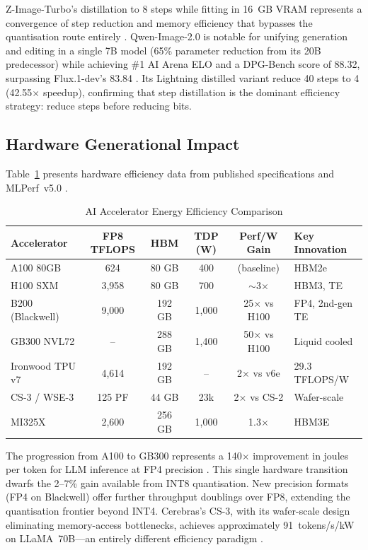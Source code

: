 \documentclass[AMS,STIX2COL]{WileyNJD-v2}
\begin{document}
Z-Image-Turbo's distillation to 8 steps while fitting in 16~GB VRAM represents a convergence of step reduction and memory efficiency that bypasses the quantisation route entirely \cite{tongyi2025zimage}. Qwen-Image-2.0 is notable for unifying generation and editing in a single 7B model (65\% parameter reduction from its 20B predecessor) while achieving \#1 AI Arena ELO and a DPG-Bench score of 88.32, surpassing Flux.1-dev's 83.84 \cite{wu2025qwenimage}. Its Lightning distilled variant reduce 40 steps to 4 (42.55$\times$ speedup), confirming that step distillation is the dominant efficiency strategy: reduce steps before reducing bits.

\subsection{Hardware Generational Impact}

Table~\ref{tab:hw_efficiency} presents hardware efficiency data from published specifications and MLPerf~v5.0 \cite{mlperf2025inference}.

\begin{table}[t]
\caption{AI Accelerator Energy Efficiency Comparison}\label{tab:hw_efficiency}
\centering
\begin{tabular}{lccccl}
\toprule
\textbf{Accelerator} & \textbf{FP8 TFLOPS} & \textbf{HBM} & \textbf{TDP (W)} & \textbf{Perf/W Gain} & \textbf{Key Innovation} \\
\midrule
A100 80GB             & 624    & 80 GB   & 400    & (baseline)         & HBM2e \\
H100 SXM              & 3,958  & 80 GB   & 700    & $\sim$3$\times$    & HBM3, TE \\
B200 (Blackwell)      & 9,000  & 192 GB  & 1,000  & 25$\times$ vs H100 & FP4, 2nd-gen TE \\
GB300 NVL72           & --     & 288 GB  & 1,400  & 50$\times$ vs H100 & Liquid cooled \\
Ironwood TPU v7       & 4,614  & 192 GB  & --     & 2$\times$ vs v6e   & 29.3 TFLOPS/W \\
CS-3 / WSE-3          & 125 PF & 44 GB   & 23k    & 2$\times$ vs CS-2  & Wafer-scale \\
MI325X                & 2,600  & 256 GB  & 1,000  & 1.3$\times$        & HBM3E \\
\bottomrule
\end{tabular}
\end{table}

The progression from A100 to GB300 represents a 140$\times$ improvement in joules per token for LLM inference at FP4 precision \cite{nvidia2025gb300}. This single hardware transition dwarfs the 2--7\% gain available from INT8 quantisation. New precision formats (FP4 on Blackwell) offer further throughput doublings over FP8, extending the quantisation frontier beyond INT4. Cerebras's CS-3, with its wafer-scale design eliminating memory-access bottlenecks, achieves approximately 91~tokens/s/kW on LLaMA~70B---an entirely different efficiency paradigm \cite{cerebras2024cs3}.
\end{document}
